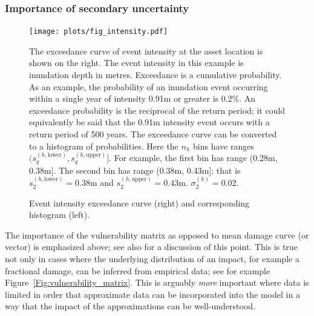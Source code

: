 \documentclass[a4paper,11pt]{extarticle} %
\begin{document}
\subsubsection{Importance of secondary uncertainty}

\begin{figure}[ht]

    \begin{framed}

        \texttt{[image: plots/fig\_intensity.pdf]}

    \end{framed}

    \footnotesize

    \renewcommand{\arraystretch}{1.01}

    \vspace{-3ex}

    {\justify
        The exceedance curve of event intensity at the asset location is shown on the right. The event intensity in this example is inundation depth in metres. Exceedance is a cumulative probability. As an example, the probability of an inundation event occurring within a single year of intensity 0.91m or greater is 0.2\%. An exceedance probability is the reciprocal of the return period; it could equivalently be said that the 0.91m intensity event occurs with a return period of 500 years.
        The exceedance curve can be converted to a histogram of probabilities. Here the $n_h$ bins have ranges $(s^{(h, \text{lower})}_q, s^{(h, \text{upper})}_q]$. For example, the first bin has range (0.28m, 0.38m]. The second bin has range (0.38m,    0.43m]; that is $s^{(h, \text{lower})}_2 = 0.38$m and $s^{(h, \text{upper})}_2 = 0.43$m. $\sigma^{(h)}_2 = 0.02$.
        \par}

    \vspace{-0.5ex}

    \caption{\small Event intensity exceedance curve (right) and corresponding histogram (left).}
    \label{Fig:intensity}

\end{figure}


The importance of the vulnerability matrix as opposed to mean damage curve (or vector) is emphasized above; see also \cite{Taylor:2015} for a discussion of this point. This is true not only in cases where the underlying distribution of an impact, for example a fractional damage, can be inferred from empirical data; see for example Figure~\ref{Fig:vulnerability_matrix}. This is arguably \emph{more} important where data is limited in order that approximate data can be incorporated into the model in a way that the impact of the approximations can be well-understood.
\end{document}
